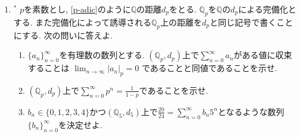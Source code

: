 \documentclass[dvipdfmx,a4paper,11pt]{article}
\newcommand{\Q}{\mathbb{Q}}
\theoremstyle{definition}
\begin{document}
\begin{enumerate}[label=\textbf{問}\ref*{sec-completion}.\arabic*]




 \item $^{*}$ $p$を素数とし, \ref{p-adic}のように$\Q$の距離$d_{p}$をとる. 
$\Q_p$を$\Q$の$d_{p}$による完備化とする. また完備化によって誘導される$\Q_p$上の距離を$d_{p}$と同じ記号で書くことにする.
次の問いに答えよ.
	\begin{enumerate}
		\setlength{\parskip}{0cm} 
  \setlength{\itemsep}{0pt} 
\item $\{ a_{n}\}_{n=0}^{\infty}$を有理数の数列とする. $(\Q_p,d_{p})$上で$\sum_{n=0}^{\infty} a_n$がある値に収束することは
$\lim_{n \rightarrow \infty}|a_n|_{p} = 0$ であることと同値であることを示せ.
\item $(\Q_p,d_{p})$上で$\sum_{n=0}^{\infty} p^n =\frac{1}{1-p}$であることを示せ. %
\item $b_n \in \{0,1,2,3,4\}$かつ$(\Q_5,d_{5})$上で$\frac{20}{24} = \sum_{n=0}^{\infty} b_n 5^n$となるような数列$\{b_n\}_{n=0}^{\infty}$を決定せよ.
\end{enumerate}


\end{enumerate}
\end{document}
